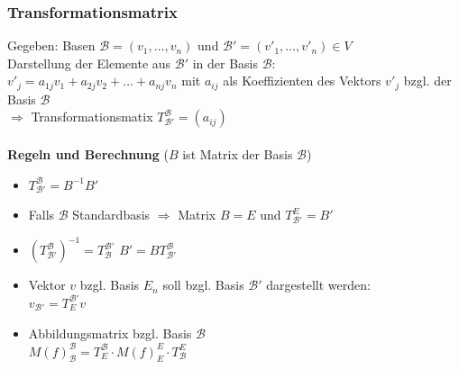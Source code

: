 \documentclass[6pt,a4paper]{scrartcl}
\newcommand{\enbrace}[1]{\ensuremath{\left(#1\right)}}
\begin{document}
\begin{multicols*}{4}
\subsubsection{Transformationsmatrix}
Gegeben: Basen $\mathcal B=(v_1, \dots,v_n)$ und $\mathcal B'=(v'_1,\dots,v'_n) \in V$ \\
Darstellung der Elemente aus $\mathcal B'$ in der Basis $\mathcal B$:\\
$v'_j = a_{1j}v_1+a_{2j}v_2+\dots+a_{nj}v_n$ mit $a_{ij}$ als Koeffizienten des Vektors $v'_j$ bzgl. der Basis $\mathcal B$\\
$\Rightarrow$ Transformationsmatix $T_{\mathcal B'}^{\mathcal B}=(a_{ij})$\\ \\
\textbf{Regeln und Berechnung} ($B$ ist Matrix der Basis $\mathcal B$)
\begin{itemize}\itemsep0pt
\item $T_{\mathcal B'}^{\mathcal B}=B^{-1}B'$
\item Falls $\mathcal B$ Standardbasis $\Rightarrow$ Matrix $B=E$ und $T_{\mathcal B'}^{E}=B'$
\item $\enbrace{T_{\mathcal B'}^{\mathcal B}}^{-1}=T_{\mathcal B}^{\mathcal B'}$ \quad \qquad $B'=BT_{\mathcal B'}^{\mathcal B}$\\
\item Vektor $v$ bzgl. Basis $E_n$ soll bzgl. Basis $\mathcal B'$ dargestellt werden: \\$v_{\mathcal B'}=T_{E}^{\mathcal B'}v$
\item Abbildungsmatrix bzgl. Basis $\mathcal{B}$ \\
$M(f)_{\mathcal{B}}^{\mathcal{B}}=T_{E}^{\mathcal{B}} \cdot M(f)_E^E \cdot T_{\mathcal{B}}^E$
\end{itemize}\itemsep0pt


\end{multicols*}
\end{document}
